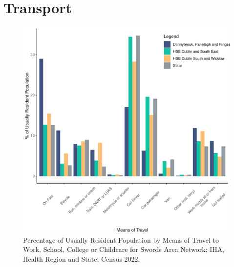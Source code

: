 \documentclass{article}
\begin{document}
\section{Transport}\label{sect:Trans}
\begin{figure}[H]
	\centering
	\includegraphics[width = 120mm]{../figures/TravelED.pdf}
	\caption{Percentage of Usually Resident Population by Means of Travel to Work, School, College or Childcare for Swords Area Network; IHA, Health Region and State; Census 2022.}
	\label{fig:vbnv}
	\end{figure}
\end{document}
